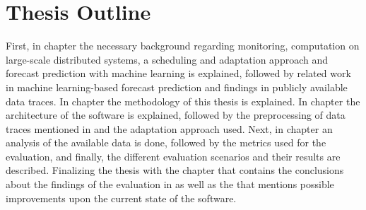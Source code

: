             




        

        
        \section{Thesis Outline}
        \label{sec:thesis-outline-introduction}

            First, in chapter  the necessary background regarding monitoring, computation on large-scale distributed systems, a scheduling and adaptation approach and forecast prediction with machine learning is explained, followed by related work in machine learning-based forecast prediction and findings in publicly available data traces.
            In chapter  the methodology of this thesis is explained. 
            In chapter  the architecture of the software is explained, followed by the preprocessing of data traces mentioned in  and the adaptation approach used.
            Next, in chapter  an analysis of the available data is done, followed by the metrics used for the evaluation, and finally, the different evaluation scenarios and their results are described.
            Finalizing the thesis with the chapter  that contains the conclusions about the findings of the evaluation in  as well as the  that mentions possible improvements upon the current state of the software.


